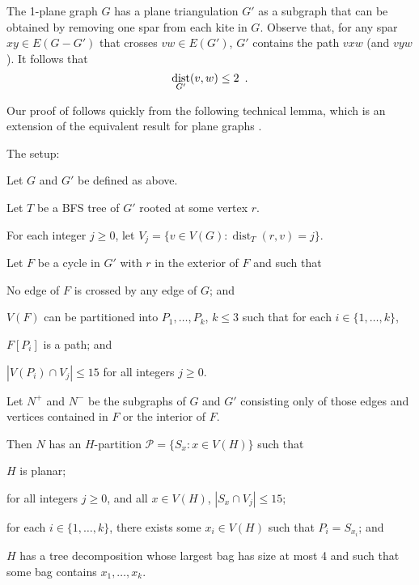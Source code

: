\documentclass{patmorin}
\DeclareMathOperator{\dist}{dist}
\begin{document}
The 1-plane graph $G$ has a plane triangulation $G'$ as a subgraph that can be obtained by removing one spar from each kite in $G$.  Observe that, for any spar $xy\in E(G-G')$ that crosses $vw\in E(G')$, $G'$ contains the path $vxw$ (and $vyw$).  It follows that 
\begin{equation}
  \dist_{G'}(v,w)\le 2 \enspace . \eqlabel{spar-distance}
\end{equation}

Our proof of  follows quickly from the following technical lemma, which is an extension of the equivalent result for plane graphs \cite{dujmovic.joret.ea:planar}.
\begin{lem} The setup:
  \begin{compactenum}
    \item Let $G$ and $G'$ be defined as above.
    \item Let $T$ be a BFS tree of $G'$ rooted at some vertex $r$.
    \item For each integer $j\ge 0$, let $V_j=\{v\in V(G):\dist_T(r,v)=j\}$. 
    \item Let $F$ be a cycle in $G'$ with $r$ in the exterior of $F$ and such that
    \begin{compactenum} 
      \item No edge of $F$ is crossed by any edge of $G$; and
      \item $V(F)$ can be partitioned into $P_1,\ldots,P_k$, $k\le 3$ such that for each $i\in\{1,\ldots,k\}$,
      \begin{compactenum}
        \item $F[P_i]$ is a path; and
        \item $|V(P_i)\cap V_j| \le 15$ for all integers $j\ge 0$.
      \end{compactenum}
    \end{compactenum}
    \item Let $N^+$ and $N^-$ be the subgraphs of $G$ and $G'$ consisting only of those edges and vertices contained in $F$ or the interior of $F$.
  \end{compactenum}
  Then $N$ has an $H$-partition $\mathcal{P}=\{S_x : x\in V(H)\}$ such that
  \begin{compactenum}
    \item $H$ is planar;
    \item for all integers $j\ge 0$, and all $x\in V(H)$, $|S_x\cap V_j|\le 15$; 
    \item for each $i\in\{1,\ldots,k\}$, there exists some $x_i\in V(H)$ such that $P_i=S_{x_i}$; and
    \item $H$ has a tree decomposition whose largest bag has size at most 4 and such that some bag contains $x_1,\ldots,x_k$.
  \end{compactenum}
\end{lem}
\end{document}

